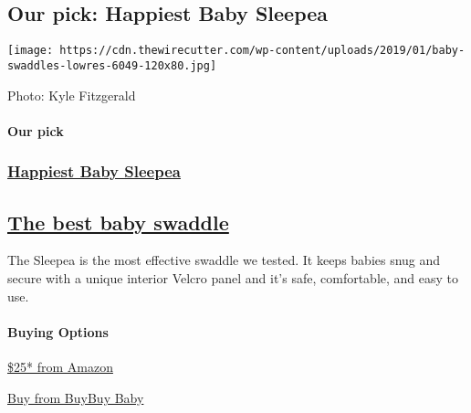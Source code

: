 \hypertarget{our-pick-happiest-baby-sleepea}{%
\subsection{Our pick: Happiest Baby
Sleepea}\label{our-pick-happiest-baby-sleepea}}

\texttt{[image: https://cdn.thewirecutter.com/wp-content/uploads/2019/01/baby-swaddles-lowres-6049-120x80.jpg]}

Photo: Kyle Fitzgerald

\hypertarget{our-pick-2}{%
\paragraph{Our pick}\label{our-pick-2}}

\href{https://www.nytimes3xbfgragh.onion/wirecutter/out/link/30686/150977/4/86632?merchant=Amazon}{}

\hypertarget{happiest-baby-sleepea-2}{%
\subsubsection{\texorpdfstring{\href{https://www.nytimes3xbfgragh.onion/wirecutter/out/link/30686/150977/4/86632?merchant=Amazon}{Happiest
Baby Sleepea}}{Happiest Baby Sleepea}}\label{happiest-baby-sleepea-2}}

\hypertarget{the-best-baby-swaddle-2}{%
\subsection{\texorpdfstring{\href{https://www.nytimes3xbfgragh.onion/wirecutter/out/link/30686/150977/4/86632?merchant=Amazon}{The
best baby
swaddle}}{The best baby swaddle}}\label{the-best-baby-swaddle-2}}

The Sleepea is the most effective swaddle we tested. It keeps babies
snug and secure with a unique interior Velcro panel and it's safe,
comfortable, and easy to use.

\hypertarget{buying-options-6}{%
\paragraph{Buying Options}\label{buying-options-6}}

\href{https://www.nytimes3xbfgragh.onion/wirecutter/out/link/30686/150977/4/86632?merchant=Amazon}{\$25*
from Amazon}

\href{https://shop-links.co/1706409514726689177}{Buy from BuyBuy Baby}

